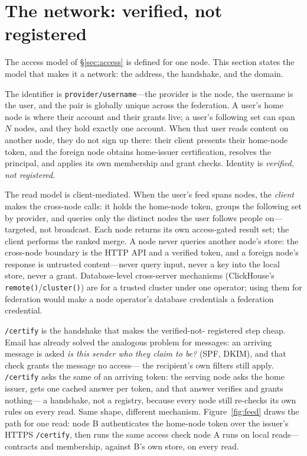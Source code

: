 \documentclass[sigconf, nonacm]{acmart}
\begin{document}
\section{The network: verified, not registered}
\label{sec:network}

The access model of \S\ref{sec:access} is defined for one node. This
section states the model that makes it a network: the address, the
handshake, and the domain.

The identifier is \texttt{provider/username}---the provider is the node,
the username is the user, and the pair is globally unique across the
federation. A user's home node is where their account and their grants
live; a user's following set can span $N$ nodes, and they hold exactly
one account. When that user reads content on another node, they do not
sign up there: their client presents their home-node token, and the
foreign node obtains home-issuer certification, resolves the principal,
and applies its own membership and grant checks. Identity is
\emph{verified, not registered}.

The read model is client-mediated. When the user's feed spans nodes, the
\emph{client} makes the cross-node calls: it holds the home-node token,
groups the following set by provider, and queries only the distinct
nodes the user follows people on---targeted, not broadcast. Each node
returns its own access-gated result set; the client performs the ranked
merge. A node never queries another node's store: the cross-node
boundary is the HTTP API and a verified token, and a foreign node's
response is untrusted content---never query input, never a key into the
local store, never a grant. Database-level cross-server mechanisms
(ClickHouse's \texttt{remote()}/\texttt{cluster()}) are for a trusted
cluster under one operator; using them for federation would make a node
operator's database credentials a federation credential.

\texttt{/certify} is the handshake that makes the verified-not-
registered step cheap. Email has already solved the analogous problem
for messages: an arriving message is asked \emph{is this sender who they
claim to be?} (SPF, DKIM), and that check grants the message no access---
the recipient's own filters still apply. \texttt{/certify} asks the same
of an arriving token: the serving node asks the home issuer, gets one
cached answer per token, and that answer verifies and grants nothing---
a handshake, not a registry, because every node still re-checks its own
rules on every read. Same shape, different mechanism.
Figure~\ref{fig:feed} draws the path for one read: node B authenticates
the home-node token over the issuer's HTTPS \texttt{/certify}, then runs
the same access check node A runs on local reads---contracts and
membership, against B's own store, on every read.
\end{document}
